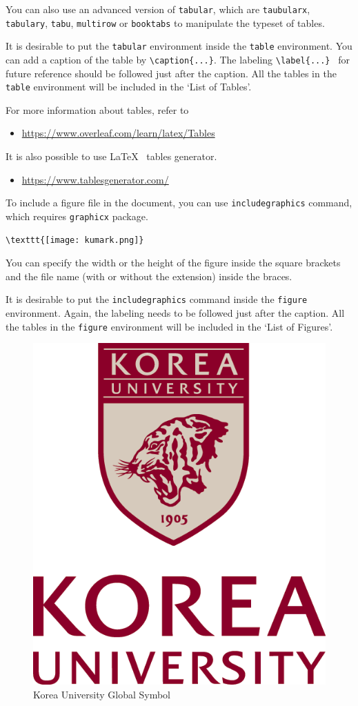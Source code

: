 You can also use an advanced version of \texttt{tabular}, which are \texttt{taubularx}, \texttt{tabulary}, \texttt{tabu}, \texttt{multirow} or \texttt{booktabs} to manipulate the typeset of tables.

It is desirable to put the \texttt{tabular} environment inside the \texttt{table} environment.
You can add a caption of the table by \verb|\caption{...}|.
The labeling \verb|\label{...} | for future reference should be followed just after the caption.
All the tables in the \texttt{table} environment will be included in the `List of Tables'.

For more information about tables, refer to \par
\begin{itemize}
\item \url{https://www.overleaf.com/learn/latex/Tables}
\end{itemize}

It is also possible to use \LaTeX ~ tables generator.  \par
\begin{itemize}
\item
\url{https://www.tablesgenerator.com/}
\end{itemize}

\newpage

To include a figure file in the document, you can use \texttt{includegraphics} command, which requires \texttt{graphicx} package.
\begin{verbatim}
\texttt{[image: kumark.png]}
\end{verbatim}

You can specify the width or the height of the figure inside the square brackets and the file name (with or without the extension) inside the braces.

It is desirable to put the \texttt{includegraphics} command inside the \texttt{figure} environment.
Again, the labeling needs to be followed just after the caption.
All the tables in the \texttt{figure} environment will be included in the `List of Figures'.
\bigskip

\begin{figure}[h]
\begin{center}
\includegraphics[width=.2\textwidth]{figures/kumark.png}
\end{center}
\caption{Korea University Global Symbol}
\label{fig:kumark}
\end{figure}

